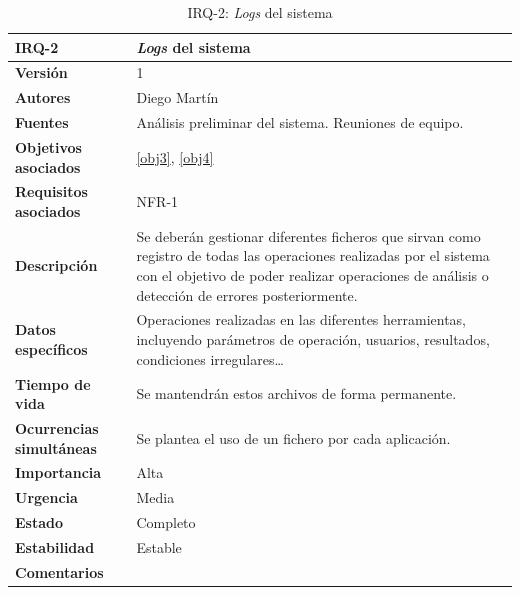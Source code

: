 \begin{table}[H]
\centering
\begin{tabular}{|p{3.5cm}|p{10cm}|}
\hline
\textbf{IRQ-2} & \textit{Logs} del sistema\\
\hline
\textbf{Versión} & 1\\
\hline
\textbf{Autores} &Diego Martín\\
\hline
\textbf{Fuentes} & Análisis preliminar del sistema. Reuniones de equipo.\\
\hline
\textbf{Objetivos asociados} & \ref{obj3}, \ref{obj4}\\
\hline
\textbf{Requisitos asociados} & NFR-1 \\
\hline
\textbf{Descripción} & Se deberán gestionar diferentes ficheros que sirvan como registro de todas las operaciones realizadas por el sistema con el objetivo de poder realizar operaciones de análisis o detección de errores posteriormente.\\
\hline
\textbf{Datos específicos} & Operaciones realizadas en las diferentes herramientas, incluyendo parámetros de operación, usuarios, resultados, condiciones irregulares\dots\\
\hline
\textbf{Tiempo de vida} & Se mantendrán estos archivos de forma permanente.\\
\hline
\textbf{Ocurrencias simultáneas} & Se plantea el uso de un fichero por cada aplicación.\\
\hline
\textbf{Importancia} &Alta\\
\hline
\textbf{Urgencia} &Media\\
\hline
\textbf{Estado} &Completo\\
\hline
\textbf{Estabilidad} &Estable\\
\hline
\textbf{Comentarios} &\\
\hline
\end{tabular}
\caption{IRQ-2: \textit{Logs} del sistema}
\end{table}

